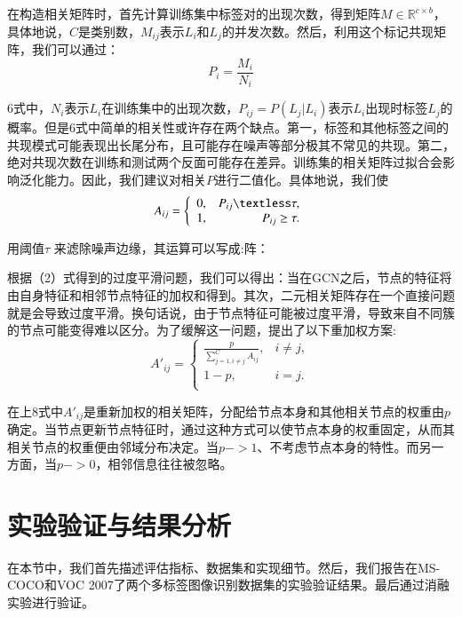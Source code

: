 在构造相关矩阵时，首先计算训练集中标签对的出现次数，得到矩阵$M\in \mathbb{R}^{c\times b}$，具体地说，$C$是类别数，$M_{ij}$表示$L_i$和$L_j$的并发次数。然后，利用这个标记共现矩阵，我们可以通过：
\begin{equation}
\label{dscNoStgProof0}
P_i = \frac{M_i}{N_i}
\end{equation}

6式中，$N_i$表示$L_i$在训练集中的出现次数，$P_{ij}=P(L_j|L_i)$表示$L_i$出现时标签$L_j$的概率。但是6式中简单的相关性或许存在两个缺点。第一，标签和其他标签之间的共现模式可能表现出长尾分布，且可能存在噪声等部分极其不常见的共现。第二，绝对共现次数在训练和测试两个反面可能存在差异。训练集的相关矩阵过拟合会影响泛化能力。因此，我们建议对相关$P$进行二值化。具体地说，我们使
\begin{equation}
A_{ij} =\left\{
\begin{array}{lr}
0, & P_{ij}\textless \tau, \\
1, & P_{ij}\geq \tau. \\
\end{array}
\right. 
\label{con:Gamma_n}
\end{equation}

用阈值$\tau$ 来滤除噪声边缘，其运算可以写成:阵：

根据（2）式得到的过度平滑问题，我们可以得出：当在GCN之后，节点的特征将由自身特征和相邻节点特征的加权和得到。其次，二元相关矩阵存在一个直接问题就是会导致过度平滑。换句话说，由于节点特征可能被过度平滑，导致来自不同簇的节点可能变得难以区分\cite{Jiang2016CNN}。为了缓解这一问题，提出了以下重加权方案:
\begin{equation}
A'_{ij} =\left\{
\begin{array}{lr}
\frac{p}{\sum_{j=1,i\neq j}^C A_{ij}}, & i\neq j, \\
1-p, & i=j. \\
\end{array}
\right. 
\label{con:Gamma_n}
\end{equation}

在上8式中$A'_{ij}$是重新加权的相关矩阵，分配给节点本身和其他相关节点的权重由$p$确定。当节点更新节点特征时，通过这种方式可以使节点本身的权重固定，从而其相关节点的权重便由邻域分布决定。当$p->1$、不考虑节点本身的特性。而另一方面，当$p->0$，相邻信息往往被忽略。


\chapter{实验验证与结果分析}
在本节中，我们首先描述评估指标、数据集和实现细节。然后，我们报告在MS-COCO\cite{Jiang2016CNN}和VOC 2007\cite{Zhang2007ML}了两个多标签图像识别数据集的实验验证结果。最后通过消融实验进行验证。

